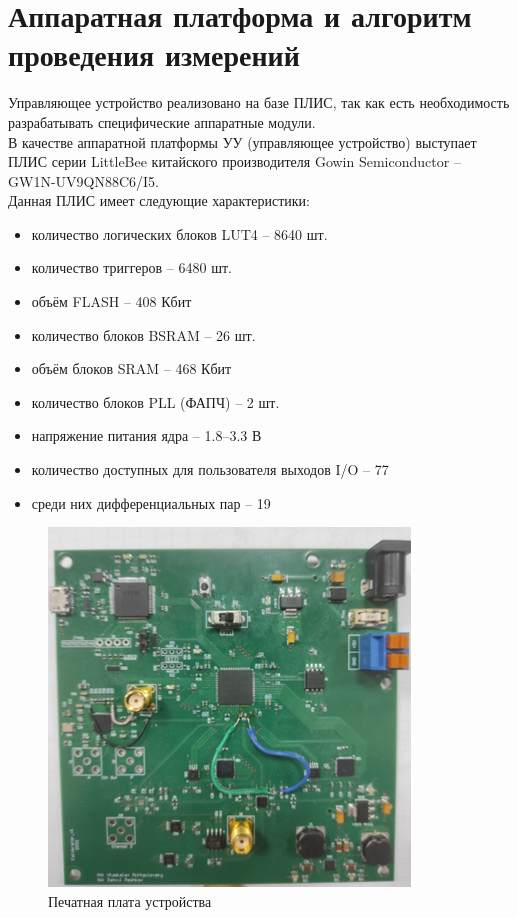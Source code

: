 \chapter{Аппаратная платформа и алгоритм проведения измерений}
	
Управляющее устройство реализовано на базе ПЛИС, так как есть необходимость разрабатывать 
специфические аппаратные модули.\\

В качестве аппаратной платформы УУ (управляющее устройство) выступает ПЛИС серии
LittleBee китайского производителя Gowin Semiconductor -- GW1N-UV9QN88C6/I5.\\

\noindent Данная ПЛИС имеет следующие характеристики:\\


\begin{itemize}
	\item количество логических блоков LUT4 -- 8640 шт.
	\item количество триггеров -- 6480 шт.
	\item объём FLASH -- 408 Кбит
	\item количество блоков BSRAM -- 26 шт.
	\item объём блоков SRAM -- 468 Кбит
	\item количество блоков PLL (ФАПЧ) -- 2 шт.
	\item напряжение питания ядра -- 1.8–3.3 В
	\item количество доступных для пользователя выходов I/O -- 77
	\item среди них дифференциальных пар -- 19\\
\end{itemize}

\begin{figure}[ht!] 
	\center
	\includegraphics {my_folder/images//pcb}
	\caption{Печатная плата устройства} 
	\label{fig:pcb}  
\end{figure}

